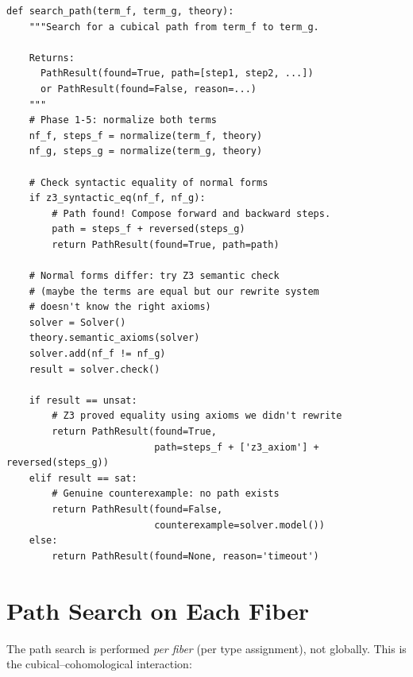\begin{lstlisting}[caption={Automated path search}]
def search_path(term_f, term_g, theory):
    """Search for a cubical path from term_f to term_g.

    Returns:
      PathResult(found=True, path=[step1, step2, ...])
      or PathResult(found=False, reason=...)
    """
    # Phase 1-5: normalize both terms
    nf_f, steps_f = normalize(term_f, theory)
    nf_g, steps_g = normalize(term_g, theory)

    # Check syntactic equality of normal forms
    if z3_syntactic_eq(nf_f, nf_g):
        # Path found! Compose forward and backward steps.
        path = steps_f + reversed(steps_g)
        return PathResult(found=True, path=path)

    # Normal forms differ: try Z3 semantic check
    # (maybe the terms are equal but our rewrite system
    # doesn't know the right axioms)
    solver = Solver()
    theory.semantic_axioms(solver)
    solver.add(nf_f != nf_g)
    result = solver.check()

    if result == unsat:
        # Z3 proved equality using axioms we didn't rewrite
        return PathResult(found=True,
                          path=steps_f + ['z3_axiom'] + reversed(steps_g))
    elif result == sat:
        # Genuine counterexample: no path exists
        return PathResult(found=False,
                          counterexample=solver.model())
    else:
        return PathResult(found=None, reason='timeout')
\end{lstlisting}

\section{Path Search on Each Fiber}

The path search is performed \emph{per fiber} (per type assignment),
not globally.  This is the cubical--cohomological interaction:

